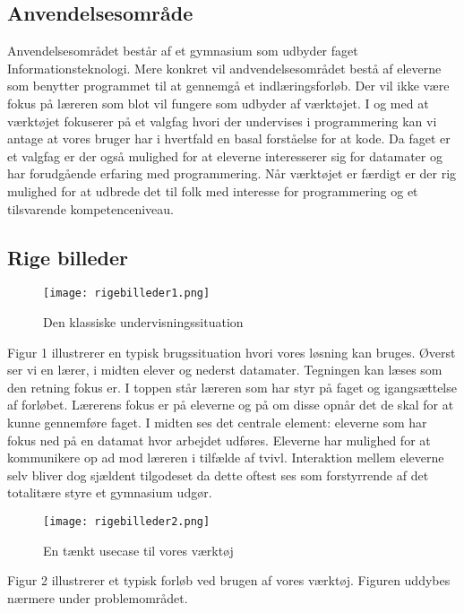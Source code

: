 \documentclass[10pt,a4paper,danish]{article}
\begin{document}
\subsection{Anvendelsesområde}
Anvendelsesområdet består af et gymnasium som udbyder faget Informationsteknologi. Mere konkret vil andvendelsesområdet bestå af eleverne som  benytter programmet til at gennemgå et indlæringsforløb. Der vil ikke være fokus på læreren som blot vil fungere som udbyder af værktøjet.
I og med at værktøjet fokuserer på et valgfag hvori der undervises i programmering kan vi antage at vores bruger har i hvertfald en basal forståelse for at kode. Da faget er et valgfag er der også mulighed for at eleverne interesserer sig for datamater og har forudgående erfaring med programmering. Når værktøjet er færdigt er der rig mulighed for at udbrede det til folk med interesse for programmering og et tilsvarende kompetenceniveau.

\subsection{Rige billeder}
\begin{figure}[htb]
\begin{center}
\leavevmode
\texttt{[image: rigebilleder1.png]}
\end{center}
\caption{Den klassiske undervisningssituation}
\label{fig:klassisk_undervisning}
\end{figure}
Figur 1 illustrerer en typisk brugssituation hvori vores løsning kan bruges.
Øverst ser vi en lærer, i midten elever og nederst datamater.
Tegningen kan læses som den retning fokus er. I toppen står læreren som har styr på faget og igangsættelse af forløbet. Lærerens fokus er på eleverne og på om disse opnår det de skal for at kunne gennemføre faget. I midten ses det centrale element: eleverne som har fokus ned på en datamat hvor arbejdet udføres. Eleverne har mulighed for at kommunikere op ad mod læreren i tilfælde af tvivl. Interaktion mellem eleverne selv bliver dog sjældent tilgodeset da dette oftest ses som forstyrrende af det totalitære styre et gymnasium udgør.
\newline
\newline
\begin{figure}[htbp]
\begin{center}
\leavevmode
\texttt{[image: rigebilleder2.png]}
\end{center}
\caption{En tænkt usecase til vores værktøj}
\label{fig:usecase}
\end{figure}
Figur 2 illustrerer et typisk forløb ved brugen af vores værktøj.
Figuren uddybes nærmere under problemområdet.
\end{document}
